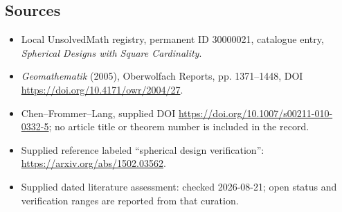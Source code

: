 \documentclass[11pt]{article}
\begin{document}
\subsection{Sources}
\begin{itemize}
\item Local UnsolvedMath registry, permanent ID 30000021, catalogue entry, \emph{Spherical Designs with Square Cardinality}.
\item \emph{Geomathematik} (2005), Oberwolfach Reports, pp. 1371--1448, DOI \url{https://doi.org/10.4171/owr/2004/27}.
\item Chen--Frommer--Lang, supplied DOI \url{https://doi.org/10.1007/s00211-010-0332-5}; no article title or theorem number is included in the record.
\item Supplied reference labeled ``spherical design verification'': \url{https://arxiv.org/abs/1502.03562}.
\item Supplied dated literature assessment: checked 2026-08-21; open status and verification ranges are reported from that curation.
\end{itemize}
\end{document}
